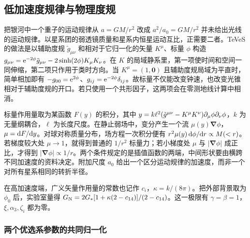 \subsection{低加速度规律与物理度规}

把银河中一个重子的运动规律从 $a=GM/r^2$ 改成 $a^2/a_0=GM/r^2$ 并未给出光线的运动规律。以星系团的弱透镜质量和星系内恒星运动互比，正需要二者。TeVeS 的做法是以辅助度规 $\tilde g_{\mu\nu}$ 和相对于它归一化的矢量 $K^\mu$、标量 $\phi$ 构造 $g_{\mu\nu}=\mathrm{e}^{-2\phi}\tilde g_{\mu\nu} -2\sinh(2\phi)K_\mu K_\nu$。在 $K$ 的局域静系里，第一项使时间和空间一同伸缩，第二项只作用于类时方向。当 $K^\mu=(1,\bm0)$ 且辅助度规局域为平直时，简单相加即有 $-g_{00}=\mathrm{e}^{2\phi}$、$g_{ij}=\mathrm{e}^{-2\phi}\delta_{ij}$。故标量不仅能改变钟速，也改变光锥相对于辅助度规的开口。若只使用一个共形因子，这两项会在零测地线计算中相消。

标量作用量取为某函数 $F(y)$ 的积分，其中 $y=k\ell^2(\tilde g^{\mu\nu}-K^\mu K^\nu)\partial_\mu\phi\partial_\nu\phi$，$k$ 为无量纲耦合，$\ell$ 为长度尺度。在静止弱场中，变分产生一个流 $\mu(y)\bm\nabla\phi$，$\mu=\dd F/\dd y$。对球对称质量分布，场方程一次积分便有 $r^2\mu(y)\,\dd\phi/\dd r\propto M(<r)$。若梯度较大处 $\mu\to1$，就得到普通的 $1/r^2$ 标量力；若小梯度处 $\mu$ 与 $|\bm\nabla\phi|$ 成正比，才得到 $|\bm\nabla\phi|\propto1/r$。两个条件规定的是插值函数的两端，中间形状要由横跨不同加速度的资料决定。附加尺度 $a_0$ 给出一个区分运动规律的加速度，而非一个对所有星系相同的转折半径。

在高加速度端，广义矢量作用量的常数也记作 $c_i$，$\kappa=k/(8\pi)$。把外部背景取为 $\phi_0$ 后，实验室量得
$G_{\rm N}=2G_*[1+\kappa(2-c_{14})]/(2-c_{14})$。这一极限有 $\gamma=\beta=1$，$\xi,\alpha_3,\zeta_i$ 都为零。

\subsubsection{两个优选系参数的共同归一化}

